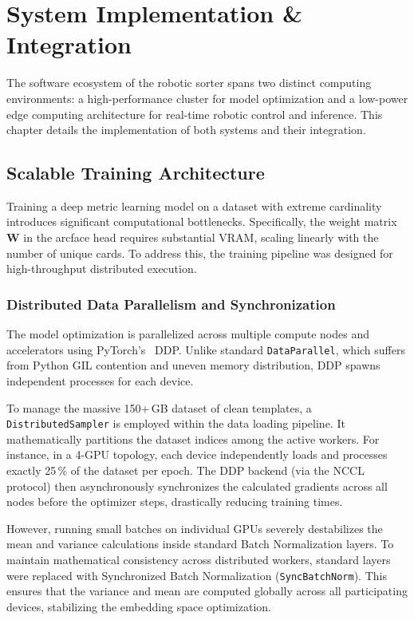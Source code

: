 
\chapter{System Implementation \& Integration}\label{chap:sw}
The software ecosystem of the robotic sorter spans two distinct computing environments: a high-performance cluster for model optimization and a low-power edge computing architecture for real-time robotic control and inference. This chapter details the implementation of both systems and their integration.

\section{Scalable Training Architecture}
Training a deep metric learning model on a dataset with extreme cardinality introduces significant computational bottlenecks. Specifically, the weight matrix $\mathbf{W}$ in the \ac{arcface} head requires substantial VRAM, scaling linearly with the number of unique cards. To address this, the training pipeline was designed for high-throughput distributed execution.

\subsection{Distributed Data Parallelism and Synchronization}
The model optimization is parallelized across multiple compute nodes and accelerators using PyTorch's~\cite{paszke2019pytorch} \ac{DDP}. Unlike standard \texttt{DataParallel}, which suffers from Python \ac{GIL} contention and uneven memory distribution, \ac{DDP} spawns independent processes for each device.

To manage the massive 150+\,GB dataset of clean templates, a \texttt{DistributedSampler} is employed within the data loading pipeline. It mathematically partitions the dataset indices among the active workers. For instance, in a 4-GPU topology, each device independently loads and processes exactly 25\,\% of the dataset per epoch. The \ac{DDP} backend (via the NCCL protocol) then asynchronously synchronizes the calculated gradients across all nodes before the optimizer steps, drastically reducing training times.

However, running small batches on individual GPUs severely destabilizes the mean and variance calculations inside standard Batch Normalization layers. To maintain mathematical consistency across distributed workers, standard layers were replaced with Synchronized Batch Normalization (\texttt{SyncBatchNorm}). This ensures that the variance and mean are computed globally across all participating devices, stabilizing the embedding space optimization.

